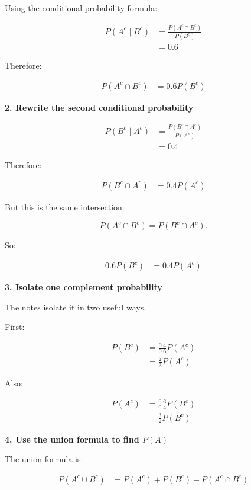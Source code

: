 \documentclass[10pt]{article}
\begin{document}
Using the conditional probability formula:

\begin{align*}
P(A^c\mid B^c)
&=
\frac{P(A^c\cap B^c)}
{P(B^c)} \\[2mm]
&=0.6
\end{align*}

Therefore:

\begin{align*}
P(A^c\cap B^c)
&=
0.6P(B^c)
\end{align*}

\textbf{2. Rewrite the second conditional probability}

\begin{align*}
P(B^c\mid A^c)
&=
\frac{P(B^c\cap A^c)}
{P(A^c)} \\[2mm]
&=0.4
\end{align*}

Therefore:

\begin{align*}
P(B^c\cap A^c)
&=
0.4P(A^c)
\end{align*}

But this is the same intersection:

\[
P(A^c\cap B^c)
=
P(B^c\cap A^c).
\]

So:

\begin{align*}
0.6P(B^c)
&=
0.4P(A^c)
\end{align*}

\textbf{3. Isolate one complement probability}

The notes isolate it in two useful ways.

First:

\begin{align*}
P(B^c)
&=
\frac{0.4}{0.6}P(A^c) \\[2mm]
&=
\frac{2}{3}P(A^c)
\end{align*}

Also:

\begin{align*}
P(A^c)
&=
\frac{0.6}{0.4}P(B^c) \\[2mm]
&=
\frac{3}{2}P(B^c)
\end{align*}

\textbf{4. Use the union formula to find $P(A)$}

The union formula is:

\begin{align*}
P(A^c\cup B^c)
&=
P(A^c)+P(B^c)-P(A^c\cap B^c)
\end{align*}
\end{document}
